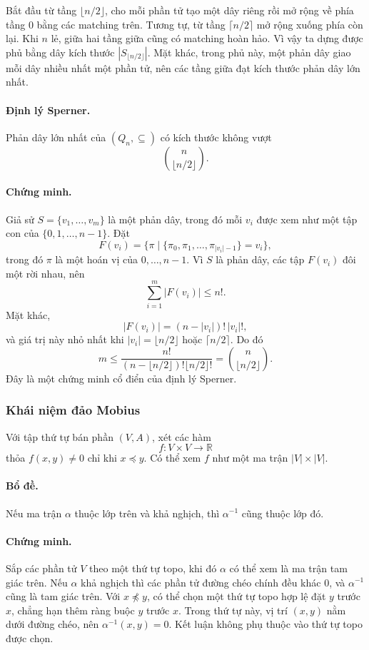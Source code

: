 \documentclass[11pt]{article}
\begin{document}
Bắt đầu từ tầng \(\lfloor n/2\rfloor\), cho mỗi phần tử tạo một dây riêng rồi
mở rộng về phía tầng \(0\) bằng các matching trên. Tương tự, từ tầng
\(\lceil n/2\rceil\) mở rộng xuống phía còn lại. Khi \(n\) lẻ, giữa hai tầng
giữa cũng có matching hoàn hảo. Vì vậy ta dựng được phủ bằng dây kích thước
\(|S_{\lfloor n/2\rfloor}|\). Mặt khác, trong phủ này, một phản dây giao mỗi
dây nhiều nhất một phần tử, nên các tầng giữa đạt kích thước phản dây lớn
nhất.

\paragraph{Định lý Sperner.}
Phản dây lớn nhất của \((Q_n,\subseteq)\) có kích thước không vượt
\[
  \binom n{\lfloor n/2\rfloor}.
\]

\paragraph{Chứng minh.}
Giả sử \(S=\{v_1,\ldots,v_m\}\) là một phản dây, trong đó mỗi \(v_i\) được xem
như một tập con của \(\{0,1,\ldots,n-1\}\). Đặt
\[
  F(v_i)=\{\pi\mid \{\pi_0,\pi_1,\ldots,\pi_{|v_i|-1}\}=v_i\},
\]
trong đó \(\pi\) là một hoán vị của \(0,\ldots,n-1\). Vì \(S\) là phản dây,
các tập \(F(v_i)\) đôi một rời nhau, nên
\[
  \sum_{i=1}^m |F(v_i)|\le n!.
\]
Mặt khác,
\[
  |F(v_i)|=(n-|v_i|)!\,|v_i|!,
\]
và giá trị này nhỏ nhất khi \(|v_i|=\lfloor n/2\rfloor\) hoặc
\(\lceil n/2\rceil\). Do đó
\[
  m\le
  \frac{n!}{(n-\lfloor n/2\rfloor)!\lfloor n/2\rfloor!}
  =\binom n{\lfloor n/2\rfloor}.
\]
Đây là một chứng minh cổ điển của định lý Sperner.

\subsubsection{Khái niệm đảo Mobius}

Với tập thứ tự bán phần \((V,A)\), xét các hàm
\[
  f:V\times V\to\mathbb R
\]
thỏa \(f(x,y)\ne 0\) chỉ khi \(x\preceq y\). Có thể xem \(f\) như một ma trận
\(|V|\times |V|\).

\paragraph{Bổ đề.}
Nếu ma trận \(\alpha\) thuộc lớp trên và khả nghịch, thì
\(\alpha^{-1}\) cũng thuộc lớp đó.

\paragraph{Chứng minh.}
Sắp các phần tử \(V\) theo một thứ tự topo, khi đó \(\alpha\) có thể xem là ma
trận tam giác trên. Nếu \(\alpha\) khả nghịch thì các phần tử đường chéo chính
đều khác \(0\), và \(\alpha^{-1}\) cũng là tam giác trên. Với \(x\not\preceq y\),
có thể chọn một thứ tự topo hợp lệ đặt \(y\) trước \(x\), chẳng hạn thêm ràng
buộc \(y\) trước \(x\). Trong thứ tự này, vị trí \((x,y)\) nằm dưới đường chéo,
nên \(\alpha^{-1}(x,y)=0\). Kết luận không phụ thuộc vào thứ tự topo được chọn.
\end{document}
